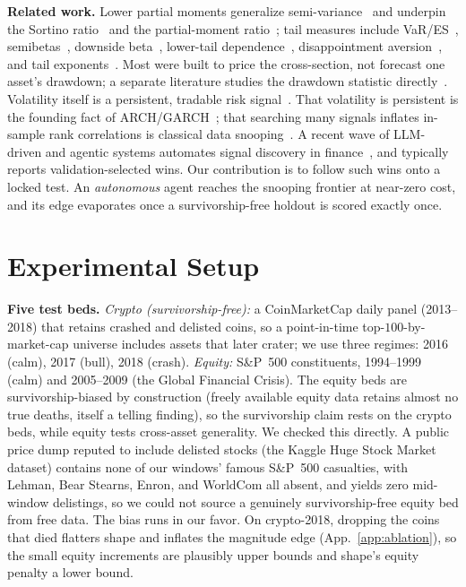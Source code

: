 \documentclass[sigconf,nonacm]{acmart}
\begin{document}
\textbf{Related work.} Lower partial moments generalize semi-variance~\cite{bawa1975,fishburn1977}
and underpin the Sortino ratio~\cite{sortino1991} and the partial-moment
ratio~\cite{violenawrocki2016}; tail measures include VaR/ES~\cite{rockafellar2000,atilgan2020},
semibetas~\cite{bpq2022}, downside beta~\cite{ang2006,leviwelch2020}, lower-tail
dependence~\cite{chabiyo2018}, disappointment aversion~\cite{faragotedongap2018}, and
tail exponents~\cite{kellyjiang2014}. Most were built to price the cross-section,
not forecast one asset's drawdown; a separate literature studies the drawdown statistic
directly~\cite{magdonismail2004,chekhlov2005}. Volatility itself is a persistent,
tradable risk signal~\cite{moreiramuir2017,frazzinipedersen2014}. That volatility is
persistent is the founding fact of ARCH/GARCH~\cite{engle1982,bollerslev1986,andersen2003,corsi2009}; that searching
many signals inflates in-sample rank correlations is classical data
snooping~\cite{white2000,sullivan1999,harvey2016,bailey2014,bailey2017}. A recent wave of
LLM-driven and agentic systems automates signal discovery in
finance~\cite{lopezlira2023,alphagpt2023,quantagent2024}, and typically reports
validation-selected wins. Our contribution is to follow such wins onto a locked test. An
\emph{autonomous} agent reaches the snooping frontier at near-zero cost, and its edge
evaporates once a survivorship-free holdout is scored exactly once.

\section{Experimental Setup}\label{sec:data}
\textbf{Five test beds.} \emph{Crypto (survivorship-free):} a CoinMarketCap daily
panel (2013--2018) that retains crashed and delisted coins, so a point-in-time
top-$100$-by-market-cap universe includes assets that later crater; we use three
regimes: 2016 (calm), 2017 (bull), 2018 (crash). \emph{Equity:} S\&P~500
constituents, 1994--1999 (calm) and 2005--2009 (the Global Financial Crisis). The equity beds are
survivorship-biased by construction (freely available equity data retains
almost no true deaths, itself a telling finding), so the survivorship claim
rests on the crypto beds, while equity tests cross-asset generality. We checked this
directly. A public price dump reputed to include delisted stocks (the Kaggle Huge Stock
Market dataset) contains none of our windows' famous S\&P~500 casualties, with Lehman,
Bear Stearns, Enron, and WorldCom all absent, and yields zero mid-window delistings, so we
could not source a genuinely survivorship-free equity bed from free data. The bias runs in
our favor. On crypto-2018, dropping the coins that died flatters shape and inflates the
magnitude edge (App.~\ref{app:ablation}), so the small equity increments are plausibly
upper bounds and shape's equity penalty a lower bound.
\end{document}
